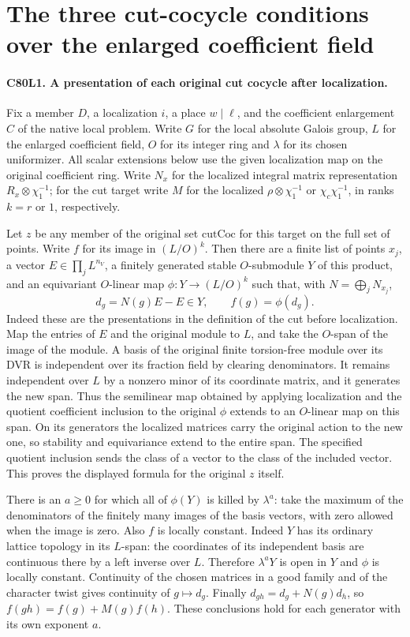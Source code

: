 \section{The three cut-cocycle conditions over the enlarged coefficient field}

\paragraph{C80L1. A presentation of each original cut cocycle after localization.}
Fix a member $D$, a localization $i$, a place $w\mid\ell$, and the
coefficient enlargement $C$ of the native local problem. Write $G$ for
the local absolute Galois group, $L$ for the enlarged coefficient
field, $O$ for its integer ring and $\lambda$ for its chosen
uniformizer. All scalar extensions below use the given localization
map on the original coefficient ring. Write $N_x$ for the localized
integral matrix representation $R_x\otimes\chi_1^{-1}$; for the
cut target write $M$ for the localized $\rho\otimes\chi_1^{-1}$
or $\chi_c\chi_1^{-1}$, in ranks $k=r$ or $1$, respectively.

Let $z$ be any member of the original set $\mathrm{cutCoc}$ for
this target on the full set of points. Write $f$ for its image
in $(L/O)^k$. Then there are a finite list of points $x_j$, a vector
$E\in\prod_j L^{n_V}$, a finitely generated stable $O$-submodule
$Y$ of this product, and an equivariant $O$-linear map
$\phi:Y\to (L/O)^k$ such that, with $N=\bigoplus_j N_{x_j}$,
\[
 d_g=N(g)E-E\in Y,\qquad f(g)=\phi(d_g).
\]
Indeed these are the presentations in the definition of the cut
before localization. Map the entries of $E$ and the original
module to $L$, and take the $O$-span of the image of the module.
A basis of the original finite torsion-free module over its DVR
is independent over its fraction field by clearing denominators.
It remains independent over $L$ by a nonzero minor of its coordinate
matrix, and it generates the new span. Thus the semilinear map obtained
by applying localization and the quotient coefficient inclusion to
the original $\phi$ extends to an $O$-linear map on this span.
On its generators the localized matrices carry the original action
to the new one, so stability and equivariance extend to the entire
span. The specified quotient inclusion sends the class of a vector
to the class of the included vector. This proves the displayed
formula for the original $z$ itself.

There is an $a\ge0$ for which all of $\phi(Y)$ is killed by
$\lambda^a$: take the maximum of the denominators of the finitely
many images of the basis vectors, with zero allowed when the image
is zero. Also $f$ is locally constant. Indeed $Y$ has its ordinary
lattice topology in its $L$-span: the coordinates of its independent
basis are continuous there by a left inverse over $L$. Therefore
$\lambda^a Y$ is open in $Y$ and $\phi$ is locally constant.
Continuity of the chosen matrices in a good family and of the
character twist gives continuity of $g\mapsto d_g$. Finally
$d_{gh}=d_g+N(g)d_h$, so $f(gh)=f(g)+M(g)f(h)$.
These conclusions hold for each generator with its own exponent $a$.

